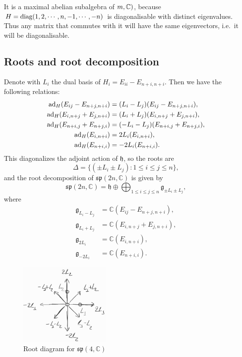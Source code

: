 \documentclass{report}
\begin{document}
It is a maximal abelian subalgebra of $\so(m, \mathbb C)$, because $H = \operatorname{diag}(1, 2, \cdots, n, -1, \cdots, -n)$ is diagonalisable with distinct eigenvalues.
Thus any matrix that commutes with it will have the same eigenvectors, i.e.\ it will be diagonalisable.

\subsection{Roots and root decomposition}
Denote with $L_i$ the dual basis of $H_i = E_{ii} - E_{n+i,n+i}$.
Then we have the following relations:
\begin{align*}
    \operatorname{ad}_{H}(E_{ij} - E_{n+j,n+i}) &= (L_i - L_j)(E_{ij} - E_{n+j,n+i}),\\
    \operatorname{ad}_{H}(E_{i,n+j} + E_{j,n+i}) &= (L_i + L_j)(E_{i,n+j} + E_{j,n+i}),\\
    \operatorname{ad}_{H}(E_{n+i,j} + E_{n+j,i}) &= (-L_i - L_j)(E_{n+i,j} + E_{n+j,i}),\\
    \operatorname{ad}_{H}(E_{i,n+i}) &= 2L_i(E_{i,n+i}),\\
    \operatorname{ad}_{H}(E_{n+i,i}) &= -2L_i(E_{n+i,i}).
\end{align*}
This diagonalizes the adjoint action of $\mathfrak h$, so the roots are
\[
\Delta = \{ (\pm L_i \pm L_j) : 1 \leq i \leq j \leq n \},
\]
and the root decomposition of $\mathfrak{sp}(2n, \mathbb C)$ is given by
\[
\mathfrak{sp}(2n,\mathbb C) = \mathfrak h \oplus \bigoplus_{1 \leq i \leq j \leq n} \mathfrak g_{\pm L_i \pm L_j},
\]
where
\begin{align*}
    \mathfrak g_{L_i - L_j} &= \mathbb C \left( E_{ij} - E_{n+j,n+i} \right),\\
    \mathfrak g_{L_i + L_j} &= \mathbb C \left( E_{i,n+j} + E_{j,n+i} \right),\\
    \mathfrak g_{2L_i} &= \mathbb C \left( E_{i,n+i} \right),\\
    \mathfrak g_{-2L_i} &= \mathbb C \left( E_{n+i,i} \right).
\end{align*}
\begin{figure}[h]
    \centering
    \includegraphics[width=0.4\textwidth]{root_diagram_sp(4,C).jpg}
    \caption{Root diagram for $\mathfrak{sp}(4, \mathbb C)$}
    \label{fig:root_diagram_sp_4_C}
\end{figure}
\end{document}
